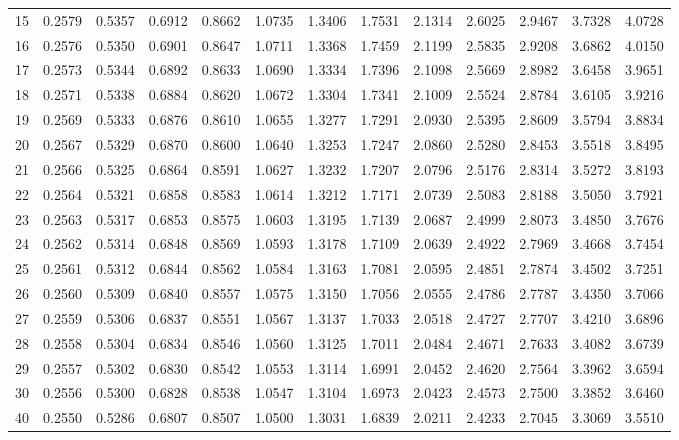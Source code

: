 \begin{table}[htbp]
\begin{tabular}{ccccccccccccc}
		15 & 0.2579 & 0.5357 & 0.6912 & 0.8662 & 1.0735 & 1.3406 & 1.7531 & 2.1314 & 2.6025 & 2.9467 & 3.7328 & 4.0728 \\
		16 & 0.2576 & 0.5350 & 0.6901 & 0.8647 & 1.0711 & 1.3368 & 1.7459 & 2.1199 & 2.5835 & 2.9208 & 3.6862 & 4.0150 \\
		17 & 0.2573 & 0.5344 & 0.6892 & 0.8633 & 1.0690 & 1.3334 & 1.7396 & 2.1098 & 2.5669 & 2.8982 & 3.6458 & 3.9651 \\
		18 & 0.2571 & 0.5338 & 0.6884 & 0.8620 & 1.0672 & 1.3304 & 1.7341 & 2.1009 & 2.5524 & 2.8784 & 3.6105 & 3.9216 \\
		19 & 0.2569 & 0.5333 & 0.6876 & 0.8610 & 1.0655 & 1.3277 & 1.7291 & 2.0930 & 2.5395 & 2.8609 & 3.5794 & 3.8834 \\
		20 & 0.2567 & 0.5329 & 0.6870 & 0.8600 & 1.0640 & 1.3253 & 1.7247 & 2.0860 & 2.5280 & 2.8453 & 3.5518 & 3.8495 \\[5pt]
		21 & 0.2566 & 0.5325 & 0.6864 & 0.8591 & 1.0627 & 1.3232 & 1.7207 & 2.0796 & 2.5176 & 2.8314 & 3.5272 & 3.8193 \\
		22 & 0.2564 & 0.5321 & 0.6858 & 0.8583 & 1.0614 & 1.3212 & 1.7171 & 2.0739 & 2.5083 & 2.8188 & 3.5050 & 3.7921 \\
		23 & 0.2563 & 0.5317 & 0.6853 & 0.8575 & 1.0603 & 1.3195 & 1.7139 & 2.0687 & 2.4999 & 2.8073 & 3.4850 & 3.7676 \\
		24 & 0.2562 & 0.5314 & 0.6848 & 0.8569 & 1.0593 & 1.3178 & 1.7109 & 2.0639 & 2.4922 & 2.7969 & 3.4668 & 3.7454 \\
		25 & 0.2561 & 0.5312 & 0.6844 & 0.8562 & 1.0584 & 1.3163 & 1.7081 & 2.0595 & 2.4851 & 2.7874 & 3.4502 & 3.7251 \\
		26 & 0.2560 & 0.5309 & 0.6840 & 0.8557 & 1.0575 & 1.3150 & 1.7056 & 2.0555 & 2.4786 & 2.7787 & 3.4350 & 3.7066 \\
		27 & 0.2559 & 0.5306 & 0.6837 & 0.8551 & 1.0567 & 1.3137 & 1.7033 & 2.0518 & 2.4727 & 2.7707 & 3.4210 & 3.6896 \\
		28 & 0.2558 & 0.5304 & 0.6834 & 0.8546 & 1.0560 & 1.3125 & 1.7011 & 2.0484 & 2.4671 & 2.7633 & 3.4082 & 3.6739 \\
		29 & 0.2557 & 0.5302 & 0.6830 & 0.8542 & 1.0553 & 1.3114 & 1.6991 & 2.0452 & 2.4620 & 2.7564 & 3.3962 & 3.6594 \\
		30 & 0.2556 & 0.5300 & 0.6828 & 0.8538 & 1.0547 & 1.3104 & 1.6973 & 2.0423 & 2.4573 & 2.7500 & 3.3852 & 3.6460 \\[5pt]
		40 & 0.2550 & 0.5286 & 0.6807 & 0.8507 & 1.0500 & 1.3031 & 1.6839 & 2.0211 & 2.4233 & 2.7045 & 3.3069 & 3.5510 \\

\end{tabular}
\end{table}
